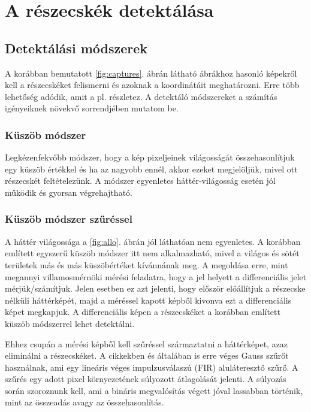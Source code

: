 \chapter{A részecskék detektálása}

\section{Detektálási módszerek}
	A korábban bemutatott \ref{fig:captures}. ábrán látható ábrákhoz hasonló képekről kell a részecskéket felismerni és
	azoknak a koordinátáit meghatározni.
	Erre több lehetőség adódik, amit a pl. \cite{Feng2007} részletez.
	A detektáló módszereket a számítás igényeiknek növekvő sorrendjében mutatom be.

\subsection{Küszöb módszer}
	Legkézenfekvőbb módszer, hogy a kép pixeljeinek világosságát összehasonlítjuk egy küszöb értékkel
	és ha az nagyobb ennél, akkor ezeket megjelöljük, mivel ott részecskét feltételezünk. 
	A módszer egyenletes háttér-világosság esetén jól működik és gyorsan végrehajtható.

\subsection{Küszöb módszer szűréssel}
	A háttér világossága a \ref{fig:allo}. ábrán jól láthatóan nem egyenletes.
	A korábban említett egyszerű küszöb módszer itt nem alkalmazható, mivel a világos és sötét
	területek más és más küszöbértéket kívánnának meg.
	A megoldása erre, mint megannyi villamosmérnöki mérési feladatra, hogy a jel helyett a
	differenciális jelet mérjük/számítjuk. Jelen esetben ez azt jelenti, hogy először előállítjuk a
	részecske nélküli háttérképét, majd a méréssel kapott képből kivonva ezt a differenciális képet megkapjuk.
	A differenciális képen a részecskéket a korábban említett küszöb módszerrel lehet detektálni.
	
	Ehhez csupán a mérési képből kell szűréssel származtatni a háttérképet, azaz eliminálni a részecskéket.
	A \cite{Feng2007,Oxtoby2010} cikkekben és általában is erre véges Gauss szűrőt használnak, ami egy
	lineáris véges impulzusválaszú (FIR) aluláteresztő szűrő.
	A szűrés egy adott pixel környezetének súlyozott átlagolását jelenti.
	A súlyozás során szoroznunk kell, ami a bináris megvalósítás végett jóval lassabban történik, mint az
	összeadás avagy az összehasonlítás.
	
